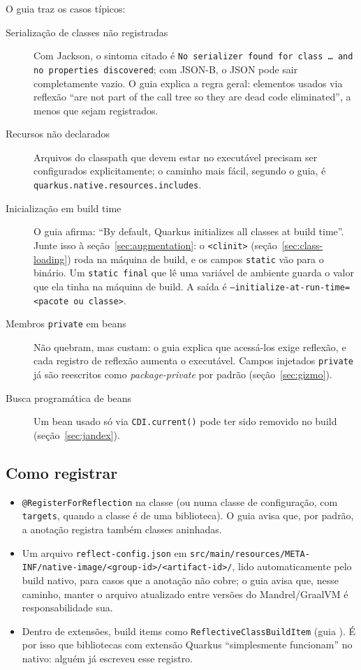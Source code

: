 O guia  traz os casos típicos:
\begin{description}
\item[Serialização de classes não registradas] Com Jackson, o sintoma
  citado é \texttt{No serializer found for class \ldots{} and no
  properties discovered}; com JSON-B, o JSON pode sair completamente
  vazio. O guia explica a regra geral: elementos usados via reflexão
  \enquote{are not part of the call tree so they are dead code
  eliminated}, a menos que sejam registrados.
\item[Recursos não declarados] Arquivos do classpath que devem estar no
  executável precisam ser configurados explicitamente; o caminho mais
  fácil, segundo o guia, é \texttt{quarkus.native.resources.includes}.
\item[Inicialização em build time] O guia afirma: \enquote{By default,
  Quarkus initializes all classes at build time}. Junte isso à
  seção~\ref{sec:augmentation}: o \texttt{<clinit>}
  (seção~\ref{sec:class-loading}) roda na máquina de build, e os campos
  \texttt{static} vão para o binário. Um \texttt{static final} que lê
  uma variável de ambiente guarda o valor que ela tinha na máquina de
  build. A saída é
  \texttt{--initialize-at-run-time=<pacote ou classe>}.
\item[Membros \texttt{private} em beans] Não quebram, mas custam: o guia
   explica que acessá-los exige
  reflexão, e cada registro de reflexão aumenta o executável. Campos
  injetados \texttt{private} já são reescritos como
  \emph{package-private} por padrão (seção~\ref{sec:gizmo}).
\item[Busca programática de beans] Um bean usado só via
  \texttt{CDI.current()} pode ter sido removido no build
  (seção~\ref{sec:jandex}).
\end{description}

\subsection*{Como registrar}

\begin{itemize}
\item \texttt{@RegisterForReflection} na classe (ou numa classe de
  configuração, com \texttt{targets}, quando a classe é de uma
  biblioteca). O guia avisa que, por padrão, a anotação registra também
  classes aninhadas.
\item Um arquivo \texttt{reflect-config.json} em
  \texttt{src/main/resources/META-INF/native-image/<group-id>/<artifact-id>/},
  lido automaticamente pelo build nativo, para casos que a anotação não
  cobre; o guia avisa que, nesse caminho, manter o arquivo atualizado entre
  versões do Mandrel/GraalVM é responsabilidade sua.
\item Dentro de extensões, build items como \texttt{ReflectiveClassBuildItem}
  (guia ). É por isso que
  bibliotecas com extensão Quarkus \enquote{simplesmente funcionam} no
  nativo: alguém já escreveu esse registro.
\end{itemize}


